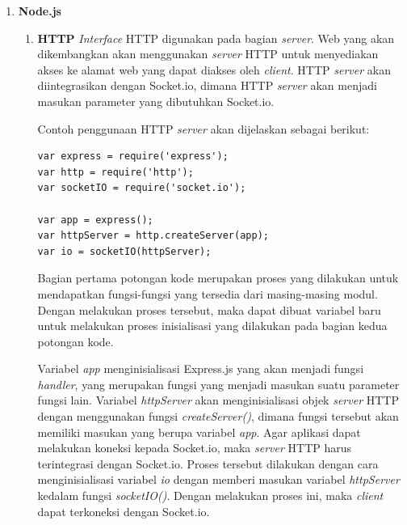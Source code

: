 \begin{enumerate}
	\item \textbf{Node.js} \\
	\begin{enumerate}
		\item \textbf{HTTP}
		\textit{Interface} HTTP digunakan pada bagian \textit{server}. Web yang akan dikembangkan akan menggunakan \textit{server} HTTP untuk menyediakan akses ke alamat web yang dapat diakses oleh \textit{client}. HTTP \textit{server} akan diintegrasikan dengan Socket.io, dimana HTTP \textit{server} akan menjadi masukan parameter yang dibutuhkan Socket.io.
		
		Contoh penggunaan HTTP \textit{server} akan dijelaskan sebagai berikut:
\begin{lstlisting}[caption={Contoh penggunaan \textit{interface} \textit{HTTP}}, label={lst:nodeHTTP}, captionpos=b]
var express = require('express');
var http = require('http');
var socketIO = require('socket.io');

var app = express();
var httpServer = http.createServer(app);
var io = socketIO(httpServer);
\end{lstlisting}

Bagian pertama potongan kode merupakan proses yang dilakukan untuk mendapatkan fungsi-fungsi yang tersedia dari masing-masing modul. Dengan melakukan proses tersebut, maka dapat dibuat variabel baru untuk melakukan proses inisialisasi yang dilakukan pada bagian kedua potongan kode.

Variabel \textit{app} menginisialisasi Express.js yang akan menjadi fungsi \textit{handler}, yang merupakan fungsi yang menjadi masukan suatu parameter fungsi lain. Variabel \textit{httpServer} akan menginisialisasi objek \textit{server} HTTP dengan menggunakan fungsi \textit{createServer()}, dimana fungsi tersebut akan memiliki masukan yang berupa variabel \textit{app}. Agar aplikasi dapat melakukan koneksi kepada Socket.io, maka \textit{server} HTTP harus terintegrasi dengan Socket.io. Proses tersebut dilakukan dengan cara menginisialisasi variabel \textit{io} dengan memberi masukan variabel \textit{httpServer} kedalam fungsi \textit{socketIO()}. Dengan melakukan proses ini, maka \textit{client} dapat terkoneksi dengan Socket.io.

		

\end{enumerate}
\end{enumerate}
